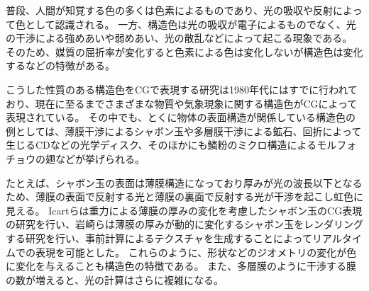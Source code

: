 普段、人間が知覚する色の多くは色素によるものであり、光の吸収や反射によって色として認識される。
一方、構造色は光の吸収が電子によるものでなく、光の干渉による強めあいや弱めあい、光の散乱などによって起こる現象\cite{}である。
そのため、媒質の屈折率が変化すると色素による色は変化しないが構造色は変化するなどの特徴がある。

こうした性質のある構造色をCGで表現する研究は1980年代にはすでに行われており、現在に至るまでさまざまな物質や気象現象に関する構造色がCGによって表現されている。
その中でも、とくに物体の表面構造が関係している構造色の例としては、薄膜干渉によるシャボン玉や多層膜干渉による鉱石、回折によって生じるCDなどの光学ディスク\figref{}、そのほかにも鱗粉のミクロ構造によるモルフォチョウの翅\figref{}などが挙げられる。

たとえば、シャボン玉の表面は薄膜構造になっており厚みが光の波長以下となるため、薄膜の表面で反射する光と薄膜の裏面で反射する光が干渉を起こし虹色に見える。
Icartら\cite{}は重力による薄膜の厚みの変化を考慮したシャボン玉のCG表現の研究を行い、岩崎ら\cite{}は薄膜の厚みが動的に変化するシャボン玉をレンダリングする研究を行い、事前計算によるテクスチャを生成することによってリアルタイムでの表現を可能とした。
これらのように、形状などのジオメトリの変化が色に変化を与えることも構造色の特徴である。
また、多層膜のように干渉する膜の数が増えると、光の計算はさらに複雑になる。


